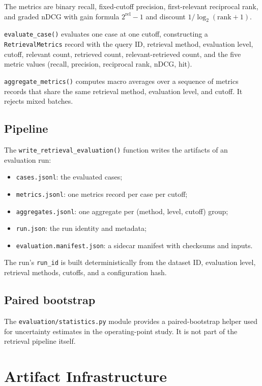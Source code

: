 \documentclass[11pt,a4paper]{article}
\begin{document}
The metrics are binary recall, fixed-cutoff precision, first-relevant
reciprocal rank, and graded nDCG with gain formula
$2^{\mathrm{rel}} - 1$ and discount $1 / \log_2(\mathrm{rank} + 1)$.

\texttt{evaluate\_case()} evaluates one case at one cutoff,
constructing a \texttt{RetrievalMetrics} record with the query ID,
retrieval method, evaluation level, cutoff, relevant count, retrieved
count, relevant-retrieved count, and the five metric values (recall,
precision, reciprocal rank, nDCG, hit).

\texttt{aggregate\_metrics()} computes macro averages over a sequence
of metrics records that share the same retrieval method, evaluation
level, and cutoff. It rejects mixed batches.

\subsection{Pipeline}
The \texttt{write\_retrieval\_evaluation()} function writes the
artifacts of an evaluation run:

\begin{itemize}[leftmargin=1.5em,itemsep=0.15em]
  \item \texttt{cases.jsonl}: the evaluated cases;
  \item \texttt{metrics.jsonl}: one metrics record per case per
    cutoff;
  \item \texttt{aggregates.jsonl}: one aggregate per (method, level,
    cutoff) group;
  \item \texttt{run.json}: the run identity and metadata;
  \item \texttt{evaluation.manifest.json}: a sidecar manifest with
    checksums and inputs.
\end{itemize}

The run's \texttt{run\_id} is built deterministically from the
dataset ID, evaluation level, retrieval methods, cutoffs, and a
configuration hash.

\subsection{Paired bootstrap}
The \texttt{evaluation/statistics.py} module provides a
paired-bootstrap helper used for uncertainty estimates in the
operating-point study. It is not part of the retrieval pipeline
itself.

\section{Artifact Infrastructure}\label{sec:artifacts}
\end{document}
